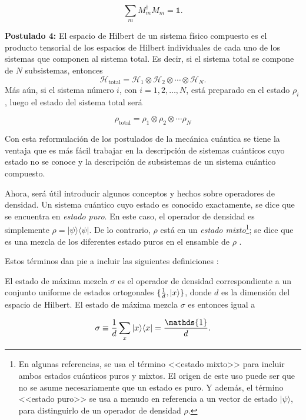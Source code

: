 \begin{equation}\label{completitud3postulate}
	  	\sum_m M_m^\dagger M_m=\mathds{1}.
\end{equation}

\textbf{Postulado 4:} El espacio de Hilbert de un sistema físico compuesto es el producto tensorial de los espacios de Hilbert individuales de cada uno de los sistemas que componen al sistema total. Es decir, si el sistema total se compone de $N$ subsistemas, entonces
\begin{equation}\label{Htotal4postulado}
	\mathcal{H}_{\text{total}}=\mathcal{H}_1\otimes \mathcal{H}_2\otimes \cdots \otimes \mathcal{H}_N.
\end{equation}
  Más aún, si el sistema número $i$, con $i=1,2,\ldots,N$, está preparado en el estado $\rho_i$, luego el estado del sistema total será 

\begin{equation}\label{rhototal4postulado}
	\rho_{\text{total}}=\rho_1\otimes \rho_2 \otimes \cdots \rho_N
\end{equation}


\setlength{\leftskip}{0pt}

Con esta reformulación de los postulados de la mecánica cuántica se tiene la ventaja que es más fácil trabajar en la descripción de sistemas cuánticos cuyo estado no se conoce y la descripción de subsistemas de un sistema cuántico compuesto.


Ahora, será útil introducir algunos conceptos y hechos sobre operadores de densidad. Un sistema cuántico cuyo estado es conocido exactamente, se dice que se encuentra en \textit{estado puro}. En este caso, el operador de densidad es simplemente $\rho=|\psi \rangle \langle \psi|$. De lo contrario, $\rho$ está en un \textit{estado mixto}\footnote{En algunas referencias, se  usa el término <<estado mixto>> para incluir ambos estados cuánticos puros y mixtos. El origen de este uso puede ser que no se asume necesariamente que un estado es puro. Y además, el término <<estado puro>> se usa a menudo en referencia a un vector de estado $|\psi\rangle $, para distinguirlo de un operador de densidad	$\rho$. }; se dice que es una mezcla de los diferentes estado puros en el ensamble de $\rho$ {\cite{nielsen_chuang_2010}}. 

Estos términos dan pie a incluir las siguientes definiciones {\cite{wilde2011classical}}:

\begin{definition} El estado de máxima mezcla $\sigma$ es el operador de densidad correspondiente a un conjunto uniforme de estados ortogonales $\{\frac{1}{d},|x\rangle\}$, donde $d$ es la dimensión del espacio de Hilbert. El estado de máxima mezcla $\sigma$ es entonces igual a
	
	
	\begin{equation}\label{maximallyMixedState}
		\sigma \equiv \dfrac{1}{d}\sum_x|x\rala x|=\dfrac{\mathds{1}}{d}.
	\end{equation}
\end{definition}



